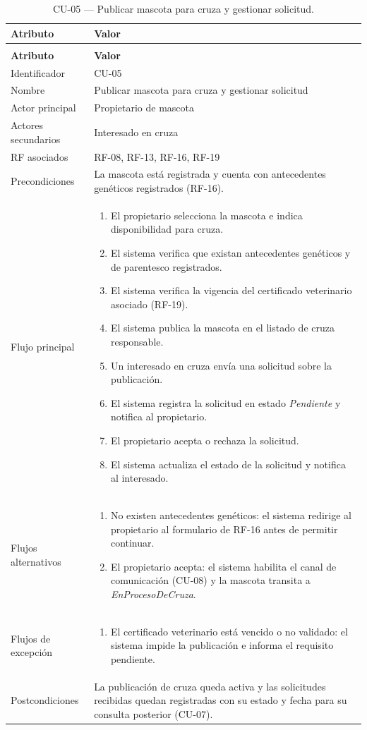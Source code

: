 \documentclass[journal,onecolumn]{IEEEtran}
\makeatletter
\newenvironment{atributos}[2]{%
	\small
	\begin{longtable}{@{}>{\raggedright\arraybackslash}p{4.2cm} >{\raggedright\arraybackslash}p{11.2cm}@{}}
		\caption{#2}\label{tab:#1}\\
		\toprule
		\textbf{Atributo} & \textbf{Valor} \\
		\midrule
		\endfirsthead
		\multicolumn{2}{@{}l}{\small\itshape (continuación)}\\
		\toprule
		\textbf{Atributo} & \textbf{Valor} \\
		\midrule
		\endhead
		\bottomrule
		\endlastfoot
	}{%
	\end{longtable}
	\normalsize
}
\makeatother
\begin{document}
	\begin{atributos}{CU-05}{CU-05 --- Publicar mascota para cruza y gestionar solicitud.}
		Identificador & CU-05 \\
		Nombre & Publicar mascota para cruza y gestionar solicitud \\
		Actor principal & Propietario de mascota \\
		Actores secundarios & Interesado en cruza \\
		RF asociados & RF-08, RF-13, RF-16, RF-19 \\
		Precondiciones & La mascota está registrada y cuenta con antecedentes genéticos registrados (RF-16). \\
		Flujo principal &
		\begin{enumerate}[leftmargin=*, nosep]
			\item El propietario selecciona la mascota e indica disponibilidad para cruza.
			\item El sistema verifica que existan antecedentes genéticos y de parentesco registrados.
			\item El sistema verifica la vigencia del certificado veterinario asociado (RF-19).
			\item El sistema publica la mascota en el listado de cruza responsable.
			\item Un interesado en cruza envía una solicitud sobre la publicación.
			\item El sistema registra la solicitud en estado \emph{Pendiente} y notifica al propietario.
			\item El propietario acepta o rechaza la solicitud.
			\item El sistema actualiza el estado de la solicitud y notifica al interesado.
		\end{enumerate} \\
		Flujos alternativos &
		\begin{enumerate}[leftmargin=*, nosep]
			\item[2.1] No existen antecedentes genéticos: el sistema redirige al propietario al formulario de RF-16 antes de permitir continuar.
			\item[7.1] El propietario acepta: el sistema habilita el canal de comunicación (CU-08) y la mascota transita a \emph{EnProcesoDeCruza}.
		\end{enumerate} \\
		Flujos de excepción &
		\begin{enumerate}[leftmargin=*, nosep]
			\item[3.1] El certificado veterinario está vencido o no validado: el sistema impide la publicación e informa el requisito pendiente.
		\end{enumerate} \\
		Postcondiciones & La publicación de cruza queda activa y las solicitudes recibidas quedan registradas con su estado y fecha para su consulta posterior (CU-07). \\
	\end{atributos}
	
\end{document}
